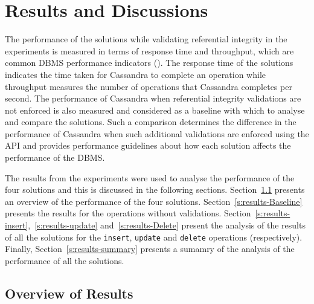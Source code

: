 \chapter{Results and Discussions}


The performance of the solutions while validating referential integrity in the
experiments is measured in terms of response time and throughput, which are
common \ac{DBMS} performance indicators ().
The response time of the solutions indicates the time taken for Cassandra to
complete an operation while throughput measures the number of operations that
Cassandra completes per second.
The performance of Cassandra when referential integrity validations are not
enforced is also measured and considered as a baseline with which to analyse and
compare the solutions. Such a comparison determines the difference in the
performance of Cassandra when such additional validations are enforced using
the \ac{API} and provides performance guidelines about how each solution affects
the performance of the \ac{DBMS}.

 The results from the experiments were used to
analyse the performance of the four solutions  and this is discussed in the
following sections.
Section~\ref{s:results-overview} presents an overview of the  performance of the
four solutions.
Section~\ref{s:results-Baseline} presents the results for the operations
without validations.
Section~\ref{s:results-insert},~\ref{s:results-update}
and~\ref{s:results-Delete} present the analysis  of the results
of all the solutions for the \texttt{insert}, \texttt{update} and
\texttt{delete} operations (respectively).
Finally, Section~\ref{s:results-summary} presents a sumamry of the analysis of
the performance of all the solutions.

\newcommand{\Width}{0.5\textwidth}
\newcommand{\TB}[1]{\textbf{#1}} 

\section{Overview of Results} \label{s:results-overview}

